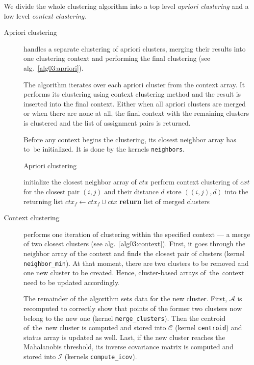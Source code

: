 We divide the whole clustering algorithm into a top level \emph{apriori clustering} and a low level \emph{context clustering}.

\begin{description}
	\item[Apriori clustering] handles a separate clustering of apriori clusters, merging their results into one clustering context and performing the final clustering (see alg.~\ref{alg03:apriori}).
	
	The algorithm iterates over each apriori cluster from the context array. It performs its clustering using context clustering method and the result is inserted into the final context. Either when all apriori clusters are merged or when there are none at all, the final context with the remaining clusters is clustered and the list of assignment pairs is returned.
	
	Before any context begins the clustering, its closest neighbor array has to~be initialized. It is done by the kernels \texttt{neighbors}.
	
	
	\begin{algorithm}
		\caption{Apriori clustering}
		\label{alg03:apriori}
		\begin{algorithmic}[1]
			 
			\State initialize the closest neighbor array of $ctx$ 
			\State perform context clustering of $cxt$ for the closest pair $(i,j)$ and their distance $d$
			\State store $((i,j),d)$ into the returning list
			\EndWhile
			\State $ctx_f \gets ctx_f \cup ctx$ 
			\EndFor
			\State \textbf{return} list of merged clusters
			\EndProcedure
		\end{algorithmic}
	\end{algorithm}

	\item[Context clustering] performs one iteration of clustering within the specified context --- a merge of two closest clusters (see alg.~\ref{alg03:context}). First, it goes through the neighbor array of the context and finds the closest pair of clusters (kernel \texttt{neighbor\_min}). At that moment, there are two clusters to be removed and one new cluster to be created. Hence, cluster-based arrays of~the~context need to be updated accordingly.
	
	The remainder of the algorithm sets data for the new cluster. First, $\mathcal{A}$ is recomputed to correctly show that points of the former two clusters now belong to the new one (kernel \texttt{merge\_clusters}). Then the centroid of~the~new cluster is computed and stored into $\mathcal{C}$ (kernel \texttt{centroid}) and status array is updated as well. Last, if the new cluster reaches the Mahalanobis threshold, its inverse covariance matrix is computed and stored into $\mathcal{I}$ (kernels \texttt{compute\_icov}). 
	

\end{description}
